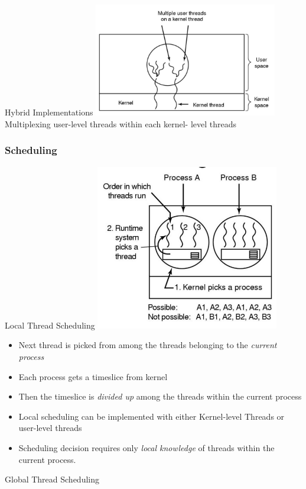 \documentclass[12pt]{article}
\begin{document}
\newline
Hybrid Implementations
\newline
\includegraphics[width=0.6\textwidth]{MultiplexingThreads.png}
\newline
Multiplexing user-level threads within each kernel- level threads
\subsubsection{Scheduling}
Local Thread Scheduling
\newline
\includegraphics[width=0.6\textwidth]{LocalThreadScheduling.png}
\begin{itemize}
    \item Next thread is picked from among the threads belonging to the \emph{current process}
    \item Each process gets a timeslice from kernel
    \item Then the timeslice is \emph{divided up} among the threads within the current process 
    \item Local scheduling can be implemented with either Kernel-level Threads or user-level threads
    \item Scheduling decision requires only \emph{local knowledge} of threads within the current process.
\end{itemize}
Global Thread Scheduling
\end{document}
